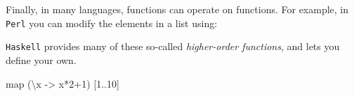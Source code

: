 \documentclass[11pt]{amsart}
\newenvironment{Shaded}{}{}
\newcommand{\KeywordTok}[1]{\textcolor[rgb]{0.00,0.44,0.13}{\textbf{{#1}}}}
\newcommand{\DataTypeTok}[1]{\textcolor[rgb]{0.56,0.13,0.00}{{#1}}}
\newcommand{\DecValTok}[1]{\textcolor[rgb]{0.25,0.63,0.44}{{#1}}}
\newcommand{\OtherTok}[1]{\textcolor[rgb]{0.00,0.44,0.13}{{#1}}}
\newcommand{\FunctionTok}[1]{\textcolor[rgb]{0.02,0.16,0.49}{{#1}}}
\newcommand{\NormalTok}[1]{{#1}}
\begin{document}
Finally, in many languages, functions can operate on functions. For
example, in \texttt{Perl} you can modify the elements in a list using:

\begin{Shaded}
\end{Shaded}

\texttt{Haskell} provides many of these so-called \emph{higher-order
functions}, and lets you define your own.

\begin{Shaded}
\begin{Highlighting}[]
    \NormalTok{map (\textbackslash{}x }\OtherTok{->} \NormalTok{x}\FunctionTok{*}\DecValTok{2}\FunctionTok{+}\DecValTok{1}\NormalTok{) [}\DecValTok{1}\FunctionTok{..}\DecValTok{10}\NormalTok{]}
\end{Highlighting}
\end{Shaded}
\end{document}

